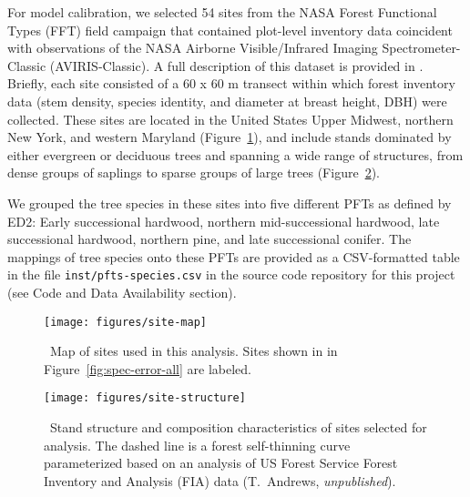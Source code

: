 For model calibration, we selected 54 sites from the NASA Forest Functional Types (FFT) field campaign that contained plot-level inventory data coincident with observations of the NASA Airborne Visible/Infrared Imaging Spectrometer-Classic (AVIRIS-Classic).
A full description of this dataset is provided in \citet{singh2015imaging}.
Briefly, each site consisted of a 60 x 60 m transect within which forest inventory data (stem density, species identity, and diameter at breast height, DBH) were collected.
These sites are located in the United States Upper Midwest, northern New York, and western Maryland (Figure~\ref{fig:site-map}),
and include stands dominated by either evergreen or deciduous trees and spanning a wide range of structures, from dense groups of saplings to sparse groups of large trees (Figure~\ref{fig:site-structure}).

We grouped the tree species in these sites into five different PFTs as defined by ED2:
Early successional hardwood, northern mid-successional hardwood, late successional hardwood, northern pine, and late successional conifer.
The mappings of tree species onto these PFTs are provided as a CSV-formatted table in the file \texttt{inst/pfts-species.csv} in the source code repository for this project (see Code and Data Availability section).

\begin{figure}
  \centering
  \texttt{[image: figures/site-map]}
  \caption{\
    Map of sites used in this analysis.
    Sites shown in in Figure~\ref{fig:spec-error-all} are labeled.
  }\label{fig:site-map}
\end{figure}

\begin{figure}
  \centering
  \texttt{[image: figures/site-structure]}
  \caption{\
    Stand structure and composition characteristics of sites selected for analysis.
    The dashed line is a forest self-thinning curve \citep[c.f.,][]{zeide2010comparison} parameterized based on an analysis of US Forest Service Forest Inventory and Analysis (FIA) data (T.\ Andrews, \emph{unpublished}).
  }\label{fig:site-structure}
\end{figure}

